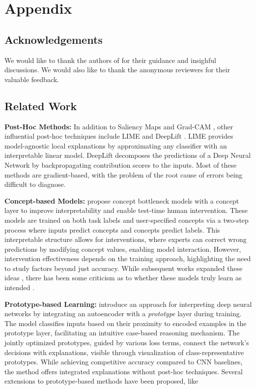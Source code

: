 \documentclass[letterpaper]{article}
\begin{document}
\section{Appendix}
\subsection{Acknowledgements}
We would like to thank the authors of \cite{Sarkar2021AFF} for their guidance and insighful discussions. We would also like to thank the anonymous reviewers for their valuable feedback.
\subsection{Related Work}\label{sec:rel_work}

\textbf{Post-Hoc Methods:} In addition to Saliency Maps \cite{saliency_maps} and Grad-CAM \cite{GradCAM}, other influential post-hoc techniques include LIME \cite{guestrin} and DeepLift \cite{deeplift}. LIME provides model-agnostic local explanations by approximating any classifier with an interpretable linear model. DeepLift decomposes the predictions of a Deep Neural Network by backpropagating contribution scores to the inputs. Most of these methods are gradient-based, with the problem of the root cause  of errors being difficult to diagnose.


\textbf{Concept-based Models: }\cite{CBM} propose concept bottleneck models with a concept layer to improve interpretability and enable test-time human intervention. These models are trained on both task labels and user-specified concepts via a two-step process where inputs predict concepts and concepts predict labels. This interpretable structure allows for interventions, where experts can correct wrong predictions by modifying concept values, enabling model interaction. However, intervention effectiveness depends on the training approach, highlighting the need to study factors beyond just accuracy. While subsequent works expanded these ideas \cite{interactive, zarlenga2022concept, yuksekgonul2022posthoc}, there has been some criticism as to whether these models truly learn as intended \cite{margeloiu2021concept}.

\textbf{Prototype-based Learning: }\cite{prototype_paper} introduce an approach for interpreting deep neural networks by integrating an autoencoder with a \textit{prototype} layer during training. The model classifies inputs based on their proximity to encoded examples in the prototype layer, facilitating an intuitive case-based reasoning mechanism. The jointly optimized prototypes, guided by various loss terms, connect the network's decisions with explanations, visible through visualization of class-representative prototypes. While achieving competitive accuracy compared to CNN baselines, the method offers integrated explanations without post-hoc techniques. 
Several extensions to prototype-based methods have been proposed, like \cite{prototype_1, Donnelly_2022_CVPR}
\end{document}

